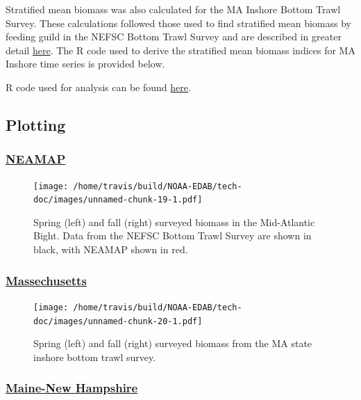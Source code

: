 \documentclass[
]{book}
\begin{document}
Stratified mean biomass was also calculated for the MA Inshore Bottom Trawl Survey. These calculations followed those used to find stratified mean biomass by feeding guild in the NEFSC Bottom Trawl Survey and are described in greater detail \protect\hyperlink{survdat}{here}. The R code used to derive the stratified mean biomass indices for MA Inshore time series is provided below.

R code used for analysis can be found \href{https://github.com/NOAA-EDAB/tech-doc/blob/master/R/stored_scripts/inshore_survey_analysis.R}{here}.

\hypertarget{plotting-14}{%
\subsection{Plotting}\label{plotting-14}}

\hypertarget{neamap}{%
\subsubsection{\texorpdfstring{\href{https://github.com/NOAA-EDAB/ecodata/blob/master/chunk-scripts/macrofauna.Rmd-agg-bio.R}{NEAMAP}}{NEAMAP}}\label{neamap}}

\begin{figure}
\centering
\texttt{[image: /home/travis/build/NOAA-EDAB/tech-doc/images/unnamed-chunk-19-1.pdf]}
\caption{\label{fig:unnamed-chunk-19}Spring (left) and fall (right) surveyed biomass in the Mid-Atlantic Bight. Data from the NEFSC Bottom Trawl Survey are shown in black, with NEAMAP shown in red.}
\end{figure}

\hypertarget{massechusetts}{%
\subsubsection{\texorpdfstring{\href{https://github.com/NOAA-EDAB/ecodata/blob/master/chunk-scripts/macrofauna.Rmd-MA-inshore.R}{Massechusetts}}{Massechusetts}}\label{massechusetts}}

\begin{figure}
\centering
\texttt{[image: /home/travis/build/NOAA-EDAB/tech-doc/images/unnamed-chunk-20-1.pdf]}
\caption{\label{fig:unnamed-chunk-20}Spring (left) and fall (right) surveyed biomass from the MA state inshore bottom trawl survey.}
\end{figure}

\hypertarget{maine-new-hampshire}{%
\subsubsection{\texorpdfstring{\href{https://github.com/NOAA-EDAB/ecodata/blob/master/chunk-scripts/macrofauna.Rmd-menh-survey.R}{Maine-New Hampshire}}{Maine-New Hampshire}}\label{maine-new-hampshire}}
\end{document}
